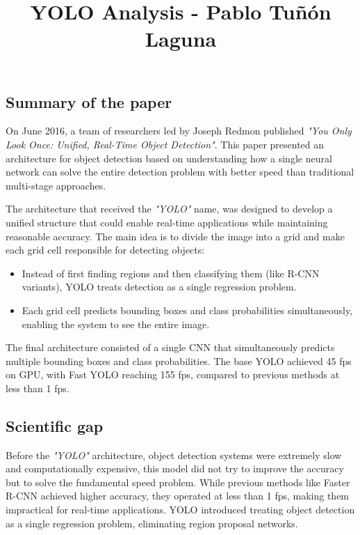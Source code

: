 \documentclass[12pt]{article}
\title{\vspace{-3cm}\textbf{YOLO Analysis - Pablo Tuñón Laguna}\vspace{-2cm}}
\begin{document}
\date{}

\maketitle

\subsection*{Summary of the paper}

On June 2016, a team of researchers led by Joseph Redmon published \textit{"You Only Look Once: Unified, Real-Time Object Detection"}. This paper presented an architecture for object detection 
based on understanding how a single neural network can solve the entire detection problem with better speed than traditional multi-stage approaches.

\vspace{0.5cm}

The architecture that received the \textit{"YOLO"} name, was designed to develop a unified structure that could enable real-time applications 
while maintaining reasonable accuracy. The main idea is to divide the image into a grid and make each grid cell responsible for detecting objects:
\begin{itemize}
    \item Instead of first finding regions and then classifying them (like R-CNN variants), YOLO treats detection as a single regression problem.
    \item Each grid cell predicts bounding boxes and class probabilities simultaneously, enabling the system to see the entire image.
\end{itemize}

\vspace{0.5cm}

The final architecture consisted of a single CNN that simultaneously predicts multiple bounding boxes and class probabilities. The base YOLO achieved 45 fps on GPU, with Fast YOLO reaching 155 fps, compared to previous methods at less than 1 fps.

\vspace{0.5cm}

\subsection*{Scientific gap}

Before the \textit{"YOLO"} architecture, object detection systems were extremely slow and computationally expensive, this model did not try to improve 
the accuracy but to solve the fundamental speed problem. While previous methods like Faster R-CNN achieved higher accuracy, they operated at less than 1 fps, making them impractical for real-time applications. 
YOLO introduced treating object detection as a single regression problem, eliminating region proposal networks.
\end{document}
